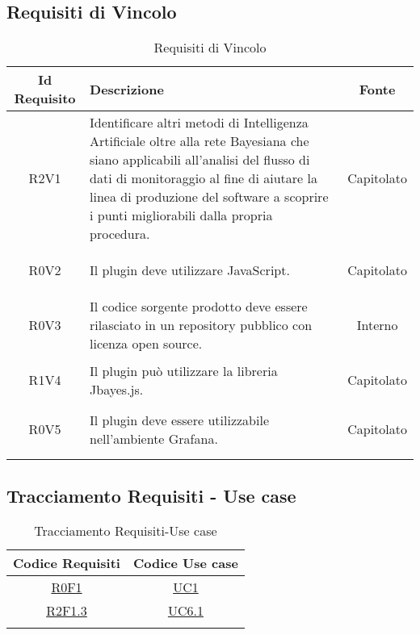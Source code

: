 \subsection{Requisiti di Vincolo}
\normalsize
\begin{longtable}{|c|H|c|}
	\hline
	\textbf{Id Requisito} & \textbf{Descrizione} & \textbf{Fonte}\\
	\hline
	\endhead
	\hypertarget{R2V1}{R2V1} & Identificare altri metodi di Intelligenza Artificiale oltre alla rete Bayesiana che siano applicabili all’analisi del flusso di dati di monitoraggio al fine di aiutare la linea di produzione del software a scoprire i punti migliorabili dalla propria procedura. & Capitolato  \\ \hline 
	\hypertarget{R0V2}{R0V2} & Il plugin deve utilizzare JavaScript. & Capitolato  \\ \hline 
	\hypertarget{R0V3}{R0V3} & Il codice sorgente prodotto deve essere rilasciato in un repository pubblico con licenza open source. & Interno  \\ \hline 
	\hypertarget{R1V4}{R1V4} & Il plugin può utilizzare la libreria Jbayes.js. & Capitolato  \\ \hline 
	\hypertarget{R0V5}{R0V5} & Il plugin deve essere utilizzabile nell’ambiente Grafana. & Capitolato  \\ \hline 
	\caption[Requisiti Di Vincolo]{Requisiti di Vincolo}
	\label{tabella:req3}
\end{longtable}
\clearpage



\subsection{Tracciamento Requisiti - Use case}
\normalsize
\begin{longtable}{|c|c|}
	\hline
	\rowcolor{dosblue}
	\textbf{Codice Requisiti} & \textbf{Codice Use case} \\
	\hline
	\endhead
	\hyperlink{R0F1}{R0F1} & \hyperlink{UC1}{UC1}\\
	\hline
	\hyperlink{R2F1.3}{R2F1.3} & \hyperlink{UC6.1}{UC6.1}\\
	\hline
	\caption[Tracciamento Requisiti-Use case]{Tracciamento Requisiti-Use case}
	\label{tabella:requi-usecase}
\end{longtable}
\clearpage

